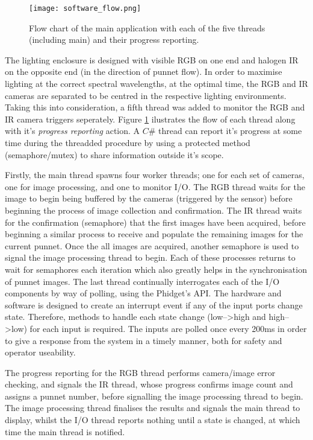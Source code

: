 \documentclass[fleqn,twoside,12pt]{report}
\begin{document}
\begin{figure}[ht]
	\centering
	\texttt{[image: software\_flow.png]}
	\caption{Flow chart of the main application with each of the five threads (including main) and their progress reporting.}
	\label{fig:software_flow}
\end{figure} 


The lighting enclosure is designed with visible RGB on one end and halogen IR on the opposite end (in the direction of punnet flow). In order to maximise lighting at the correct spectral wavelengths, at the optimal time, the RGB and IR cameras are separated to be centred in the respective lighting environments. Taking this into consideration, a fifth thread was added to monitor the RGB and IR camera triggers seperately. Figure \ref{fig:software_flow} ilustrates the flow of each thread along with it's \textit{progress reporting} action. A $C\#$ thread can report it's progress at some time during the threadded procedure by using a protected method (semaphore/mutex) to share information outside it's scope. 

Firstly, the main thread spawns four worker threads; one for each set of cameras, one for image processing, and one to monitor I/O. The RGB thread waits for the image to begin being buffered by the cameras (triggered by the sensor) before beginning the process of image collection and confirmation. The IR thread waits for the confirmation (semaphore) that the first images have been acquired, before beginning a similar process to receive and populate the remaining images for the current punnet. Once the all images are acquired, another semaphore is used to signal the image processing thread to begin. Each of these processes returns to wait for semaphores each iteration which also greatly helps in the synchronisation of punnet images. The last thread continually interrogates each of the I/O components by way of polling, using the Phidget\texttrademark's API. The hardware and software is designed to create an interrupt event if any of the input ports change state. Therefore, methods to handle each state change (low-->high and high-->low) for each input is required. The inputs are polled once every 200ms in order to give a response from the system in a timely manner, both for safety and operator useability.

The progress reporting for the RGB thread performs camera/image error checking, and signals the IR thread, whose progress confirms image count and assigns a punnet number, before signalling the image processing thread to begin. The image processing thread finalises the results and signals the main thread to display, whilst the I/O thread reports nothing until a state is changed, at which time the main thread is notified.
\end{document}
